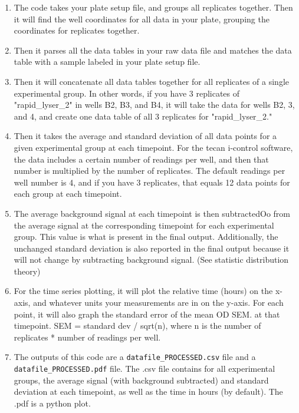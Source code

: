 \documentclass[12pt]{article}
\begin{document}
\begin{enumerate}
\item The code takes your plate setup file, and groups all replicates
together. Then it will find the well coordinates for all data in your
plate, grouping the coordinates for replicates together.

\item Then it parses all the data tables in your raw data file and matches
the data table with a sample labeled in your plate setup file.

\item Then it will concatenate all data tables together for all replicates
of a single experimental group. In other words, if you have 3
replicates of "rapid\_lyser\_2" in wells B2, B3, and B4, it will take
the data for wells B2, 3, and 4, and create one data table of all 3
replicates for "rapid\_lyser\_2."

\item Then it takes the average and standard deviation of all data points
for a given experimental group at each timepoint. For the tecan
i-control software, the data includes a certain number of readings
per well, and then that number is multiplied by the number of
replicates. The default readings per well number is 4, and if you
have 3 replicates, that equals 12 data points for each group at each
timepoint.

\item The average background signal at each timepoint is then subtractedOo
from the average signal at the corresponding timepoint for each
experimental group. This value is what is present in the final
output. Additionally, the unchanged standard deviation is also
reported in the final output because it will not change by
subtracting background signal. (See statistic distribution theory)

\item For the time series plotting, it will plot the relative time (hours)
on the x-axis, and whatever units your measurements are in on the
y-axis. For each point, it will also graph the standard error of the
mean OD \textpm{} SEM. at that timepoint. SEM = standard dev / sqrt(n), where
n is the number of replicates * number of readings per well.

\item The outputs of this code are a \texttt{datafile\_PROCESSED.csv} file and a
\texttt{datafile\_PROCESSED.pdf} file. The .csv file contains for all
experimental groups, the average signal (with background subtracted)
and standard deviation at each timepoint, as well as the time in
hours (by default). The .pdf is a python plot.
\end{enumerate}
\end{document}
